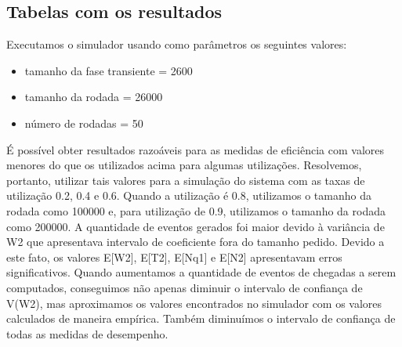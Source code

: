 \documentclass[a4paper,10pt]{article}
\begin{document}
      \subsection{Tabelas com os resultados}
      Executamos o simulador usando como parâmetros os seguintes valores:
      \begin{itemize}
       \item tamanho da fase transiente = 2600
       \item tamanho da rodada = 26000
       \item número de rodadas = 50
      \end{itemize}
      É possível obter resultados razoáveis para as medidas de eficiência com valores
      menores do que os utilizados acima para algumas utilizações.
      Resolvemos, portanto, utilizar tais valores para a simulação do sistema com as
      taxas de utilização 0.2, 0.4 e 0.6. Quando a utilização é 0.8, utilizamos o tamanho da
      rodada como 100000 e, para utilização de 0.9, utilizamos o tamanho da rodada como
      200000.
      A quantidade de eventos gerados foi maior devido à variância de W2 que
      apresentava intervalo de coeficiente fora do tamanho pedido. Devido a este fato, os
      valores E[W2], E[T2], E[Nq1] e E[N2] apresentavam erros significativos.
      Quando aumentamos a quantidade de eventos de chegadas a serem
      computados, conseguimos não apenas diminuir o intervalo de confiança de V(W2),
      mas aproximamos os valores encontrados no simulador com os valores calculados de
      maneira empírica. Também diminuímos o intervalo de confiança de todas as medidas de
      desempenho.
\end{document}

